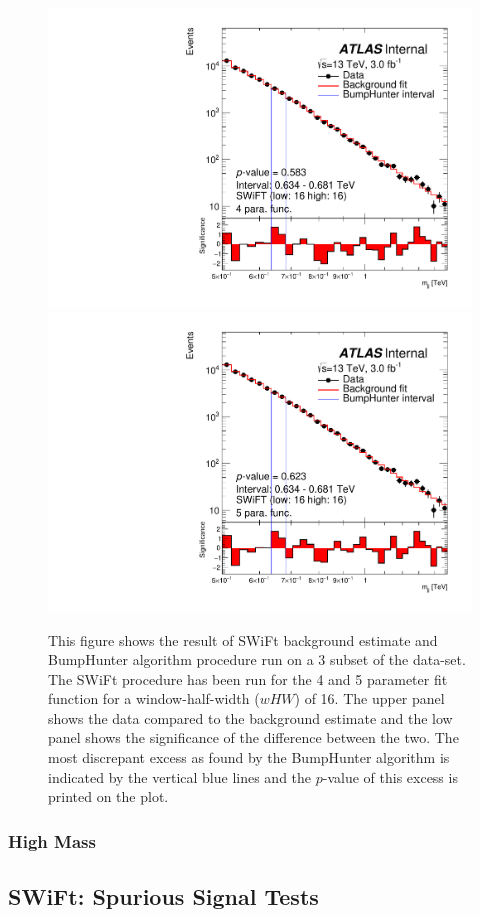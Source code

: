 \begin{figure}[!htb]
\captionsetup[subfigure]{aboveskip=0pt,justification=centering}
\centering
{} {
  \includegraphics[width=0.45\linewidth, angle=0]{figs/Dibjet/LowMass/FitStudy/bhFit_subset_4para_low16_high16.pdf}
}
 {
  \includegraphics[width=0.45\linewidth, angle=0]{figs/Dibjet/LowMass/FitStudy/bhFit_subset_5para_low16_high16.pdf}
}
\vspace{10pt}
\caption{\label{fig:bhFit_lm_subset}
  This figure shows the result of SWiFt background estimate and {\sc BumpHunter} algorithm procedure run on a 3 \ifb{} subset of the \lm{} data-set.
  The SWiFt procedure has been run for the 4 and 5 parameter fit function for a window-half-width ($wHW$) of 16.
  The upper panel shows the data compared to the background estimate and the low panel shows the significance of the difference between the two.
  The most discrepant excess as found by the {\sc BumpHunter} algorithm is indicated by the vertical blue lines and the $p$-value of this excess is printed on the plot. }
\end{figure}

\subsubsection{High Mass}
\label{sec:highmass_windowSelTests} 

\subsection{SWiFt: Spurious Signal Tests}
\label{sec:spuriousSignal}

